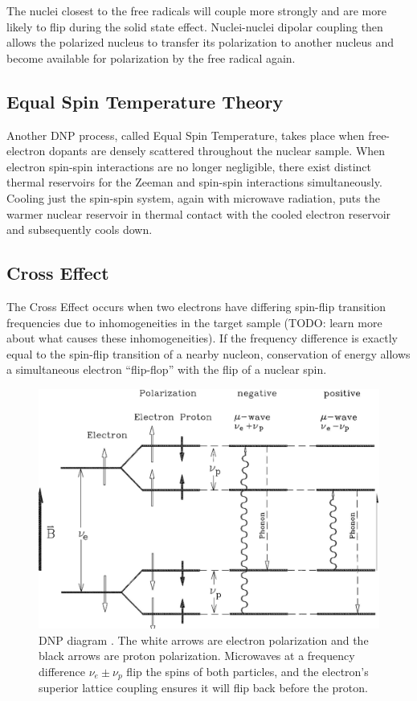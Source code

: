 The nuclei closest to the free radicals will couple more strongly and are more likely to flip during the solid state effect.  Nuclei-nuclei dipolar coupling then allows the polarized nucleus to transfer its polarization to another nucleus and become available for polarization by the free radical again.

\subsection{Equal Spin Temperature Theory}
Another DNP process, called Equal Spin Temperature, takes place when free-electron dopants are densely scattered throughout the nuclear sample.  When electron spin-spin interactions are no longer negligible, there exist distinct thermal reservoirs for the Zeeman and spin-spin interactions simultaneously.  Cooling just the spin-spin system, again with microwave radiation, puts the warmer nuclear reservoir in thermal contact with the cooled electron reservoir and subsequently cools down.

\subsection{Cross Effect}

The Cross Effect occurs when two electrons have differing spin-flip transition frequencies due to inhomogeneities in the target sample (TODO: learn more about what causes these inhomogeneities).  If the frequency difference is exactly equal to the spin-flip transition of a nearby nucleon, conservation of energy allows a simultaneous electron ``flip-flop'' with the flip of a nuclear spin.

\begin{figure}
 \centering
 \includegraphics[scale=.25]{img/dnp.png}
 \caption{DNP diagram \cite{dnpdiagram}.  The white arrows are electron polarization and the black arrows are proton polarization.  Microwaves at a frequency difference $\nu_e\pm\nu_p$ flip the spins of both particles, and the electron's superior lattice coupling ensures it will flip back before the proton.}
 \label{fig:dnp-diagram}
\end{figure}


